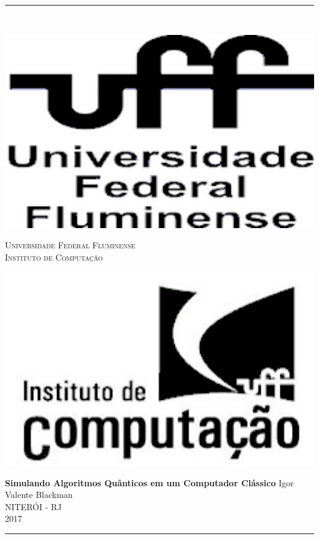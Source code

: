 \documentclass[a4paper, 12pt, oneside]{book}
\def\titulo{Simulando Algoritmos Quânticos em um
Computador Clássico}
\def\nome{Igor Valente Blackman}
\def\ano{2017}
\begin{document}

\begin{titlepage}
 \noindent 
 \rule{\textwidth}{1ex} \\ [1ex]
 \begin{center}
  \begin{minipage}{0.15\textwidth}
   \includegraphics[width=1\textwidth]{./logoUFF.png} 
  \end{minipage}
  \begin{minipage}{0.65\textwidth}
   \centering
   {\large \textsc{Universidade Federal Fluminense} } \\ [1.5ex]
   {\large \textsc{Instituto de Computação} } 
  \end{minipage}
  \begin{minipage}{0.15\textwidth}
   \includegraphics[width=1\textwidth]{./logoIC.png}
  \end{minipage}
    
  \vfill
  {\Huge \textbf{\titulo}} \vfill
  {\huge \nome} \\ [25ex]
  {\large NITERÓI - RJ} \\ [1.5ex]
  {\large \ano}
 \end{center}\vspace{1ex}
 \rule{\textwidth}{1ex}
\end{titlepage}
\end{document}
